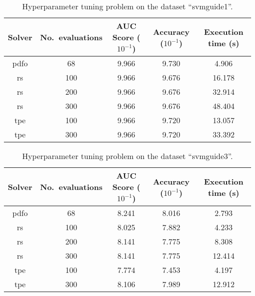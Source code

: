 \documentclass[11pt,draft]{article}
\numberwithin{equation}{section}
\begin{document}
\begin{table}[!ht]
    \caption{Hyperparameter tuning problem on the dataset \enquote{svmguide1}.}
    \centering
    \begin{tabular}{cS[table-parse-only]SSS}
        \toprule
        Solver                          &
            {No.\ evaluations}              &
            {AUC Score ($10^{-1}$)}         &
            {Accuracy ($10^{-1}$)}          &
            {Execution time (\si{\second})}\\
        \midrule
        \gls{pdfo}  & 68    & 9.966 & 9.730 & 4.906\\
        \gls{rs}    & 100   & 9.966 & 9.676 & 16.178\\
        \gls{rs}    & 200   & 9.966 & 9.676 & 32.914\\
        \gls{rs}    & 300   & 9.966 & 9.676 & 48.404\\
        \gls{tpe}   & 100   & 9.966 & 9.720 & 13.057\\
        \gls{tpe}   & 300   & 9.966 & 9.720 & 33.392\\
        \bottomrule
    \end{tabular}
\end{table}

\begin{table}[!ht]
    \caption{Hyperparameter tuning problem on the dataset \enquote{svmguide3}.}
    \centering
    \begin{tabular}{cS[table-parse-only]SSS}
        \toprule
        Solver                          &
            {No.\ evaluations}              &
            {AUC Score ($10^{-1}$)}         &
            {Accuracy ($10^{-1}$)}          &
            {Execution time (\si{\second})}\\
        \midrule
        \gls{pdfo}  & 68    & 8.241 & 8.016 & 2.793\\
        \gls{rs}    & 100   & 8.025 & 7.882 & 4.233\\
        \gls{rs}    & 200   & 8.141 & 7.775 & 8.308\\
        \gls{rs}    & 300   & 8.141 & 7.775 & 12.414\\
        \gls{tpe}   & 100   & 7.774 & 7.453 & 4.197\\
        \gls{tpe}   & 300   & 8.106 & 7.989 & 12.912\\
        \bottomrule
    \end{tabular}
\end{table}
\end{document}
